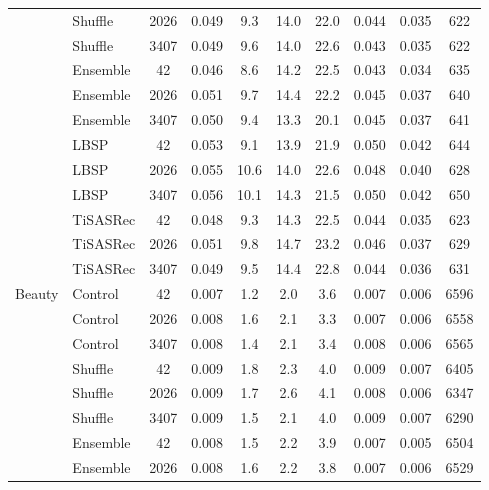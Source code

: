 \begin{longtable}{@{}llS[table-format=4.0]S[table-format=1.3]S[table-format=2.1]S[table-format=2.1]S[table-format=2.1]S[table-format=1.3]S[table-format=1.3]S[table-format=5.0]@{}}
 & Shuffle & 2026 & 0.049 & 9.3 & 14.0 & 22.0 & 0.044 & 0.035 & 622\\ %
 & Shuffle & 3407 & 0.049 & 9.6 & 14.0 & 22.6 & 0.043 & 0.035 & 622\\ %
 & Ensemble & 42 & 0.046 & 8.6 & 14.2 & 22.5 & 0.043 & 0.034 & 635\\ %
 & Ensemble & 2026 & 0.051 & 9.7 & 14.4 & 22.2 & 0.045 & 0.037 & 640\\ %
 & Ensemble & 3407 & 0.050 & 9.4 & 13.3 & 20.1 & 0.045 & 0.037 & 641\\ %
 & LBSP & 42 & 0.053 & 9.1 & 13.9 & 21.9 & 0.050 & 0.042 & 644\\ %
 & LBSP & 2026 & 0.055 & 10.6 & 14.0 & 22.6 & 0.048 & 0.040 & 628\\ %
 & LBSP & 3407 & 0.056 & 10.1 & 14.3 & 21.5 & 0.050 & 0.042 & 650\\ %
 & TiSASRec & 42 & 0.048 & 9.3 & 14.3 & 22.5 & 0.044 & 0.035 & 623\\ %
 & TiSASRec & 2026 & 0.051 & 9.8 & 14.7 & 23.2 & 0.046 & 0.037 & 629\\ %
 & TiSASRec & 3407 & 0.049 & 9.5 & 14.4 & 22.8 & 0.044 & 0.036 & 631\\ %
\midrule
Beauty & Control & 42 & 0.007 & 1.2 & 2.0 & 3.6 & 0.007 & 0.006 & 6596\\ %
 & Control & 2026 & 0.008 & 1.6 & 2.1 & 3.3 & 0.007 & 0.006 & 6558\\ %
 & Control & 3407 & 0.008 & 1.4 & 2.1 & 3.4 & 0.008 & 0.006 & 6565\\ %
 & Shuffle & 42 & 0.009 & 1.8 & 2.3 & 4.0 & 0.009 & 0.007 & 6405\\ %
 & Shuffle & 2026 & 0.009 & 1.7 & 2.6 & 4.1 & 0.008 & 0.006 & 6347\\ %
 & Shuffle & 3407 & 0.009 & 1.5 & 2.1 & 4.0 & 0.009 & 0.007 & 6290\\ %
 & Ensemble & 42 & 0.008 & 1.5 & 2.2 & 3.9 & 0.007 & 0.005 & 6504\\ %
 & Ensemble & 2026 & 0.008 & 1.6 & 2.2 & 3.8 & 0.007 & 0.006 & 6529\\ %

\end{longtable}
